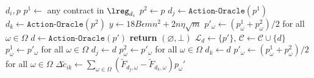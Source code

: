 \begin{algorithm}[H]
	\caption{\texttt{Find-HS}}\label{alg:find_hyperplane}
	\begin{algorithmic}[1]
		\Require ${d_i}, p$
		\State $p^1 \gets $ any contract in $ \lreg_{d_i}$
		\State $p^2 \gets p$
		\State $d_j\gets \texttt{Action-Oracle}(p^1)$
		\State $d_k \gets \texttt{Action-Oracle}(p^2)$
		\State $y \gets 18 B \epsilon m n^2 + 2  n \eta \sqrt{m}$
		\label{line:hyperplane_loop}
		\State $p'_\omega \leftarrow (p^1_\omega + p^2_\omega)/2$ for all $\omega \in \Omega$\Comment{\textcolor{gray}{Middle point of the current line segment}}
		\State $d \leftarrow \texttt{Action-Oracle}(p')$
		{\textbf{return} $(\varnothing, \bot)$}\label{line:bot_hp}
		 \label{line:add_hp_1}
		\State $\mathcal{L}_{d} \gets \{ p' \}$, $\mathcal{C} \gets \mathcal{C} \cup \{d\}$\label{line:add_hp_2}
		\EndIf
		\State $p^1_\omega \leftarrow p'_\omega$ for all $\omega \in \Omega$
		\State $d_j\gets d$
		\Else
		\State $p^2_\omega \leftarrow p'_\omega$ for all $\omega \in \Omega$
		\State $d_k \gets d$
		\EndIf
		\EndWhile
		\State $p'_\omega \leftarrow (p^1_\omega + p^2_\omega)/2$ for all $\omega \in \Omega$\label{line:calc_hp_1}
		 
		\State $\Delta \widetilde{c}_{ik} \gets \sum\limits_{\omega \in \Omega} \left(  \widetilde{F}_{d_{j},\omega} -  \widetilde{F}_{d_{k},\omega} \right) p_{\omega}' $ \label{line:def_delta_cost_1}

\end{algorithmic}
\end{algorithm}
